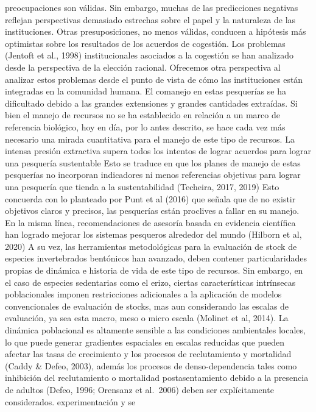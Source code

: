 \documentclass[
]{article}
\begin{document}
preocupaciones son válidas. Sin embargo, muchas de las predicciones
negativas reflejan perspectivas demasiado estrechas sobre el papel y la
naturaleza de las instituciones. Otras presuposiciones, no menos
válidas, conducen a hipótesis más optimistas sobre los resultados de los
acuerdos de cogestión. Los problemas (Jentoft et al., 1998)
institucionales asociados a la cogestión se han analizado desde la
perspectiva de la elección racional. Ofrecemos otra perspectiva al
analizar estos problemas desde el punto de vista de cómo las
instituciones están integradas en la comunidad humana. El comanejo en
estas pesquerías se ha dificultado debido a las grandes extensiones y
grandes cantidades extraídas. Si bien el manejo de recursos no se ha
establecido en relación a un marco de referencia biológico, hoy en día,
por lo antes descrito, se hace cada vez más necesario una mirada
cuantitativa para el manejo de este tipo de recursos. La intensa presión
extractiva supera todos los intentos de lograr acuerdos para lograr una
pesquería sustentable Esto se traduce en que los planes de manejo de
estas pesquerías no incorporan indicadores ni menos referencias
objetivas para lograr una pesquería que tienda a la sustentabilidad
(Techeira, 2017, 2019) Esto concuerda con lo planteado por Punt et al
(2016) que señala que de no existir objetivos claros y precisos, las
pesquerías están proclives a fallar en su manejo. En la misma línea,
recomendaciones de asesoría basada en evidencia científica han logrado
mejorar los sistemas pesqueros alrededor del mundo (Hilborn et al, 2020)
A su vez, las herramientas metodológicas para la evaluación de stock de
especies invertebrados bentónicos han avanzado, deben contener
particularidades propias de dinámica e historia de vida de este tipo de
recursos. Sin embargo, en el caso de especies sedentarias como el erizo,
ciertas características intrínsecas poblacionales imponen restricciones
adicionales a la aplicación de modelos convencionales de evaluación de
stocks, mas aun considerando las escalas de evaluación, ya sea esta
macro, meso o micro escala (Molinet et al, 2014). La dinámica
poblacional es altamente sensible a las condiciones ambientales locales,
lo que puede generar gradientes espaciales en escalas reducidas que
pueden afectar las tasas de crecimiento y los procesos de reclutamiento
y mortalidad (Caddy \& Defeo, 2003), además los procesos de
denso-dependencia tales como inhibición del reclutamiento o mortalidad
postasentamiento debido a la presencia de adultos (Defeo, 1996; Orensanz
et al.~2006) deben ser explícitamente considerados. experimentación y se
\end{document}
